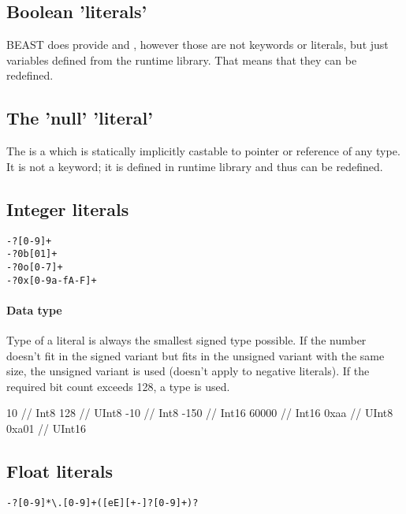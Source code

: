 \subsection{Boolean 'literals'}
BEAST does provide  and , however those are not keywords or literals, but just  variables defined from the runtime library. That means that they can be redefined.

\subsection{The 'null' 'literal'}
The  is a  which is statically implicitly castable to pointer or reference of any type. It is not a keyword; it is defined in runtime library and thus can be redefined.

\subsection{Integer literals}
\begin{grammar}
	 \verb|-?[0-9]+| \\
	 \verb|-?0b[01]+| \\
	 \verb|-?0o[0-7]+| \\
	 \verb|-?0x[0-9a-fA-F]+|
\end{grammar}

\paragraph{Data type} Type of a literal is always the smallest signed type possible. If the number doesn't fit in the signed variant but fits in the unsigned variant with the same size, the unsigned variant is used (doesn't apply to negative literals). If the required bit count exceeds 128, a  type is used.

\begin{code}
10 // Int8
128 // UInt8
-10 // Int8
-150 // Int16
60000 // Int16
0xaa // UInt8
0xa01 // UInt16
\end{code}

\subsection{Float literals}
\begin{grammar}
	 \verb|-?[0-9]*\.[0-9]+([eE][+-]?[0-9]+)?|
\end{grammar}

